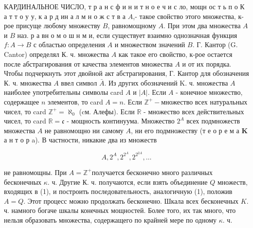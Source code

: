 \documentclass[10pt]{article}
\begin{document}
КАРДИНАЛЬНОЕ ЧИСЛО, т р а н с ф и н и т н о е ч и с ло, мощн ос т ь п о К а т т о у у, к а р д ин а л м н о ж с т в а $A$,- такое свойство этого множества, к-рое присуще любому множеству $B$, равномощному $A$. При этом два множества $A$ и $B$ наз. р а вн о м о ш н м и, если существует взаимно однозначная функция $f: A \rightarrow B$ с областью определения $A$ и множеством значений $B$. Г. Кантор (G. Cantor) определял К. ч. множества $A$ как такое его свойство, к-рое остается после абстрагирования от качества элементов множества $A$ и от их порядка. Чтобы подчеркнуть этот двойной акт абстрагирования, Г. Кантор для обозначения К. ч. множества $A$ ввел символ $\bar{A}$. Из других обозначений $\mathrm{K}$. ч. множества $A$ наиболее употребительны символы card $A$ и $|A|$. Если $A$ - конечное множество, содержащее $n$ элементов, то card $A=n$. Если $\mathbb{Z}^{+}-$множество всех натуральных чисел, то card $\mathbb{Z}^{+}=\aleph_{0}$ (cм. Алефы). Если $\mathbb{R}$ - множество всех действительных чисел, то card $\mathbb{R}=\mathfrak{c}$ - мощность континуума. Множество $2^{A}$ всех подмножеств множества $A$ не равномощно ни самому $A$, ни его подмножеству (т е о р е м а $\mathbf{K}$ а н т о р a). В частности, никакие два из множеств



\[

A, 2^{A}, 2^{2^{A}}, 2^{2^{2 A}}, \ldots

\]



не равномощны. При $A=\mathbb{Z}^{+}$получается бесконечно много различных бесконечных $\kappa$. ч. Другие К. ч. получаются, если взять объединение $Q$ множеств, входящих в (1), и построить последовательность, аналогичную (1), положив $A=Q$. Этот процесс можно продолжать бесконечно. Шкала всех бесконечных $K$. ч. намного богаче шкалы конечных мощностей. Более того, их так много, что нельзя образовать множества, содержащего по крайней мере по одному $\kappa$. ч.
\end{document}
